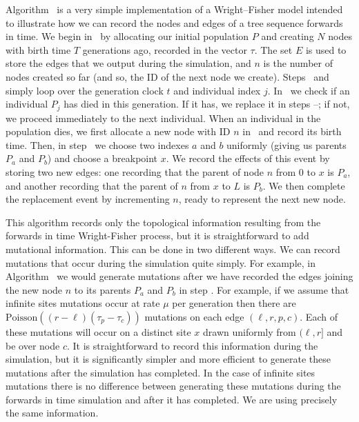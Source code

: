 \documentclass{article}
\begin{document}
Algorithm~ is a very simple implementation of a Wright--Fisher model
intended to illustrate how we can record the nodes and edges of a tree sequence
forwards in time. We begin in~ by allocating our initial population $P$
and creating $N$ nodes with birth time $T$ generations ago, recorded in the
vector $\tau$. The set $E$ is used to store the edges that we output during the
simulation, and $n$ is the number of nodes created so far (and so, the ID of
the next node we create). Steps~ and~ simply loop over
the generation clock $t$ and individual index $j$. In~ we check if
an individual $P_j$ has died in this generation. If it has, we replace it in
steps --; if not, we proceed immediately to the next
individual. When an individual in the population dies, we first allocate
a new node with ID $n$ in~ and record its birth time. Then,
in step~ we choose two indexes $a$ and $b$ uniformly (giving us
parents $P_a$ and $P_b$) and choose a breakpoint $x$. We record the effects of this
event by storing two new edges: one recording that the parent of node $n$
from $0$ to $x$ is $P_a$, and another recording that the parent of $n$
from $x$ to $L$ is $P_b$. We then complete the replacement event by incrementing
$n$, ready to represent the next new node.

This algorithm records only the topological information resulting from the
forwards in time Wright-Fisher process, but it is straightforward to add
mutational information. This can be done in two different ways.
We can record mutations that occur during the simulation quite simply.
For example, in Algorithm~ we would generate mutations after
we have recorded the edges joining the new node $n$ to its parents
$P_a$ and $P_b$ in step .
For example, if we assume that infinite sites mutations
occur at rate $\mu$ per generation then there are $\mbox{Poisson}\left((r - \ell)(\tau_p
- \tau_c)\right)$ mutations on each edge $(\ell, r, p, c)$. Each of these mutations
will occur on a distinct site $x$ drawn uniformly from $(\ell, r]$ and be over node $c$.
It is straightforward to record this information during the simulation, but it
is significantly simpler and more efficient to generate these mutations
after the simulation has completed. In the case of infinite sites mutations
there is no difference between generating these mutations during the forwards
in time simulation and after it has completed. We are using precisely the same
information.
\end{document}
